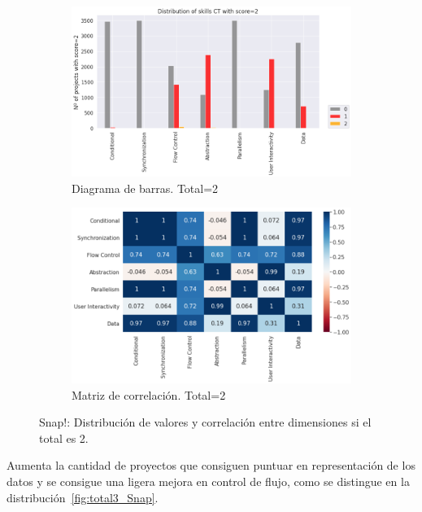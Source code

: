 \documentclass[a4paper, 12pt]{book}
\begin{document}
\begin{figure}[H]
    \centering
    \begin{subfigure}[h]{.49\textwidth} 
        \includegraphics[width=\textwidth]{img/distribucion_2_Snap}
        \caption{Diagrama de barras. Total=2}
        \label{fig:total2_Snap}
    \end{subfigure}       
    \begin{subfigure}[h]{.49\textwidth} 
        \includegraphics[width=\textwidth]{img/corr_2_Snap}
        \caption{Matriz de correlación. Total=2}
        \label{fig:corr2_Snap}
    \end{subfigure}
     \caption{Snap!: Distribución de valores y correlación entre dimensiones si el total es 2.}
\end{figure}

Aumenta la cantidad de proyectos que consiguen puntuar en representación de los datos y se consigue una ligera mejora en control de flujo, como se distingue en la distribución~\ref{fig:total3_Snap}.
\end{document}
